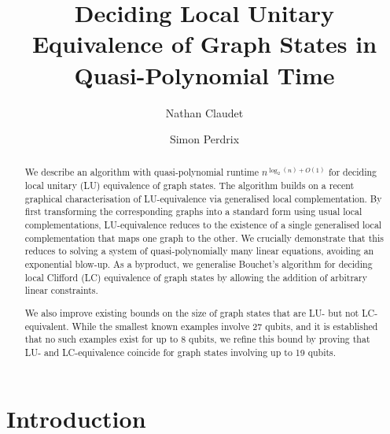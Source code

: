 \documentclass[a4paper,UKenglish,cleveref,autoref,thm-restate]{arxiv}
\title{Deciding  Local Unitary Equivalence of Graph States in Quasi-Polynomial Time}
\author{Nathan Claudet}{Inria Mocqua and Université de Lorraine, CNRS, LORIA, F-54000 Nancy, France
}{nathan.claudet@inria.fr}{https://orcid.org/0009-0000-0862-1264}{}
\author{Simon Perdrix}{Inria Mocqua and Université de Lorraine, CNRS, LORIA, F-54000 Nancy, France}{simon.perdrix@loria.fr}{https://orcid.org/0000-0002-1808-2409}{}
\begin{document}
\maketitle

\begin{abstract}  

    We describe an algorithm with quasi-polynomial runtime $n^{\log_2(n)+O(1)}$ for deciding local unitary (LU) equivalence of graph states. The algorithm builds on a recent graphical characterisation of LU-equivalence via generalised local complementation. By first transforming the corresponding graphs into a standard form using usual local complementations, LU-equivalence reduces to the existence of  a single generalised local complementation that maps one graph to the other. We crucially demonstrate that this reduces to solving a system of quasi-polynomially many linear equations, avoiding an exponential blow-up. As a byproduct, we generalise Bouchet's algorithm for deciding local Clifford (LC) equivalence of graph states by allowing the addition of arbitrary linear constraints. 
    
    We also improve existing bounds on the size of graph states that are LU- but not LC-equivalent. While the smallest known examples involve 27 qubits, and it is established that no such examples exist for up to 8 qubits, we refine this bound by proving that LU- and LC-equivalence coincide for graph states involving up to 19 qubits.
\end{abstract}

\section{Introduction}
\end{document}
